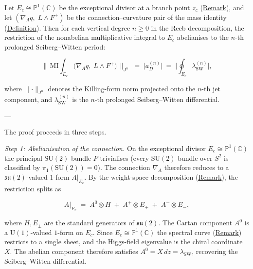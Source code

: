 \begin{proposition}
  \label{prop:mi-sw-abelianisation}
Let $E_c \cong \mathbb{P}^1(\mathbb{C})$ be the exceptional divisor at a branch
point $z_c$ (\hyperref[rem:brings-smoothness]{Remark}), and let
$(\nabla_A q,\; L \wedge F^+)$ be the connection--curvature pair of the
mass identity (\hyperref[def:mass-identity]{Definition}).  Then for each
vertical degree $n \geq 0$ in the Reeb decomposition, the restriction
of the nonabelian multiplicative integral to $E_c$ abelianises to the
$n$-th prolonged Seiberg--Witten period:

\begin{equation}\label{eq:mi-sw-abelianisation}
  \bigl\lVert\,
  \mathrm{MI}\!\!\int_{E_c}
  \bigl(\nabla_A q,\; L \wedge F^+\bigr)
  \,\bigr\rVert_{J^n}
  \;=\;
  \bigl\lvert a_D^{(n)}\bigr\rvert
  \;=\;
  \biggl\lvert\oint_{E_c}\lambda_{\mathrm{SW}}^{(n)}\biggr\rvert,
\end{equation}

where $\lVert\cdot\rVert_{J^n}$ denotes the Killing-form norm projected
onto the $n$-th jet component, and $\lambda_{\mathrm{SW}}^{(n)}$ is the
$n$-th prolonged Seiberg--Witten differential.

---

The proof proceeds in three steps.

\emph{Step 1: Abelianisation of the connection.}
On the exceptional divisor $E_c \cong \mathbb{P}^1(\mathbb{C})$ the principal
$\mathrm{SU}(2)$-bundle $P$ trivialises (every $\mathrm{SU}(2)$-bundle
over $S^2$ is classified by $\pi_1(\mathrm{SU}(2)) = 0$).  The
connection $\nabla_A$ therefore reduces to a $\mathfrak{su}(2)$-valued
$1$-form $A|_{E_c}$.  By the weight-space decomposition
(\hyperref[rem:weight-space-decomposition]{Remark}), the restriction splits as

\[
A\big|_{E_c}
  \;=\;
  A^0 \otimes H
  \;+\;
  A^+ \otimes E_+
  \;+\;
  A^- \otimes E_-,
\]

where $H, E_\pm$ are the standard generators of $\mathfrak{su}(2)$.
The Cartan component $A^0$ is a $\mathrm{U}(1)$-valued $1$-form on
$E_c$.  Since $E_c \cong \mathbb{P}^1(\mathbb{C})$ the spectral curve
(\hyperref[rem:chiral-bundles]{Remark}) restricts to a single sheet, and the
Higgs-field eigenvalue is the chiral coordinate $X$.  The abelian
component therefore satisfies $A^0 = X\,dz = \lambda_{\mathrm{SW}}$,
recovering the Seiberg--Witten
differential.


\end{proposition}
